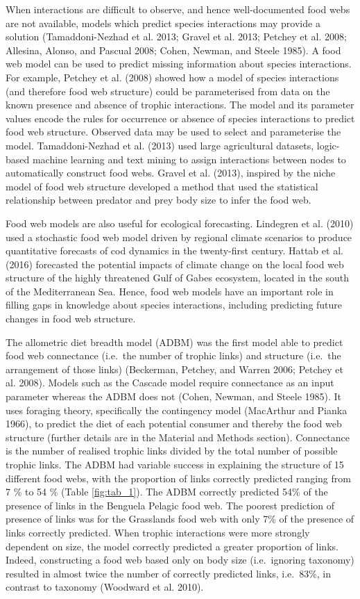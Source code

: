\documentclass{article}
\begin{document}
When interactions are difficult to observe, and hence well-documented
food webs are not available, models which predict species interactions
may provide a solution (Tamaddoni-Nezhad et al. 2013; Gravel et al.
2013; Petchey et al. 2008; Allesina, Alonso, and Pascual 2008; Cohen,
Newman, and Steele 1985). A food web model can be used to predict
missing information about species interactions. For example, Petchey et
al. (2008) showed how a model of species interactions (and therefore
food web structure) could be parameterised from data on the known
presence and absence of trophic interactions. The model and its
parameter values encode the rules for occurrence or absence of species
interactions to predict food web structure. Observed data may be used to
select and parameterise the model. Tamaddoni-Nezhad et al. (2013) used
large agricultural datasets, logic-based machine learning and text
mining to assign interactions between nodes to automatically construct
food webs. Gravel et al. (2013), inspired by the niche model of food web
structure developed a method that used the statistical relationship
between predator and prey body size to infer the food web.

Food web models are also useful for ecological forecasting. Lindegren et
al. (2010) used a stochastic food web model driven by regional climate
scenarios to produce quantitative forecasts of cod dynamics in the
twenty-first century. Hattab et al. (2016) forecasted the potential
impacts of climate change on the local food web structure of the highly
threatened Gulf of Gabes ecosystem, located in the south of the
Mediterranean Sea. Hence, food web models have an important role in
filling gaps in knowledge about species interactions, including
predicting future changes in food web structure.

The allometric diet breadth model (ADBM) was the first model able to
predict food web connectance (i.e.~the number of trophic links) and
structure (i.e.~the arrangement of those links) (Beckerman, Petchey, and
Warren 2006; Petchey et al. 2008). Models such as the Cascade model
require connectance as an input parameter whereas the ADBM does not
(Cohen, Newman, and Steele 1985). It uses foraging theory, specifically
the contingency model (MacArthur and Pianka 1966), to predict the diet
of each potential consumer and thereby the food web structure (further
details are in the Material and Methods section). Connectance is the
number of realised trophic links divided by the total number of possible
trophic links. The ADBM had variable success in explaining the structure
of 15 different food webs, with the proportion of links correctly
predicted ranging from 7 \% to 54 \% (Table \ref{fig:tab_1}). The ADBM
correctly predicted 54\% of the presence of links in the Benguela
Pelagic food web. The poorest prediction of presence of links was for
the Grasslands food web with only 7\% of the presence of links correctly
predicted. When trophic interactions were more strongly dependent on
size, the model correctly predicted a greater proportion of links.
Indeed, constructing a food web based only on body size (i.e.~ignoring
taxonomy) resulted in almost twice the number of correctly predicted
links, i.e.~83\%, in contrast to taxonomy (Woodward et al. 2010).
\end{document}
